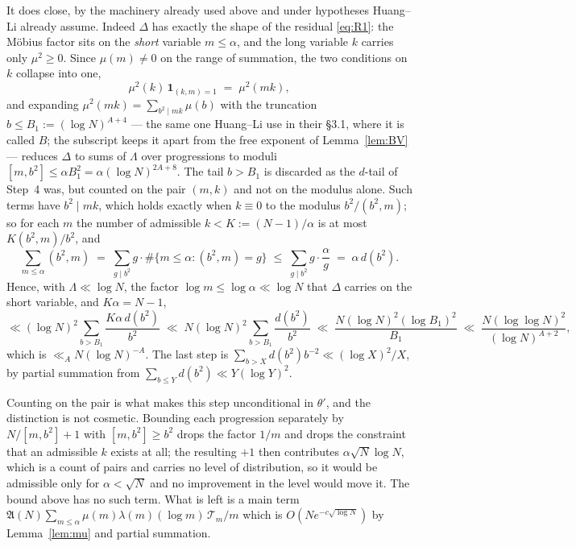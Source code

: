 \documentclass[11pt,a4paper]{article}
\theoremstyle{plain}
\theoremstyle{definition}
\theoremstyle{remark}
\newcommand{\AAA}{\mathfrak{A}}
\newcommand{\Tcut}{\mathcal T}
\begin{document}
It does close, by the machinery already used above and under
hypotheses Huang--Li already assume. Indeed $\Delta$ has exactly the
shape of the residual \eqref{eq:R1}: the M\"obius factor sits on the
\emph{short} variable $m\le\alpha$, and the long variable $k$ carries
only $\mu^2\ge0$. Since $\mu(m)\neq0$ on the range of summation, the
two conditions on $k$ collapse into one,
\begin{equation}\label{eq:mu2mk}
  \mu^2(k)\,\mathbf 1_{(k,m)=1}\;=\;\mu^2(mk),
\end{equation}
and expanding $\mu^2(mk)=\sum_{b^2\mid mk}\mu(b)$ with the truncation
$b\le B_1:=(\log N)^{A+4}$ --- the same one Huang--Li use in their
\S3.1, where it is called $B$; the subscript keeps it apart from the
free exponent of Lemma~\ref{lem:BV} --- reduces $\Delta$ to sums of
$\Lambda$ over progressions to moduli
$[m,b^2]\le\alpha B_1^2=\alpha(\log N)^{2A+8}$. The tail $b>B_1$ is
discarded as the $d$-tail of Step~4 was, but counted on the pair
$(m,k)$ and not on the modulus alone. Such terms have $b^2\mid mk$,
which holds exactly when $k\equiv0$ to the modulus $b^2/(b^2,m)$; so
for each $m$ the number of admissible $k<K:=(N-1)/\alpha$ is at most
$K(b^2,m)/b^{2}$, and
\[
  \sum_{m\le\alpha}(b^2,m)
   \;=\;\sum_{g\mid b^2}g\cdot\#\{m\le\alpha:(b^2,m)=g\}
   \;\le\;\sum_{g\mid b^2}g\cdot\frac{\alpha}{g}
   \;=\;\alpha\,d(b^2).
\]
Hence, with $\Lambda\ll\log N$, the factor $\log m\le\log\alpha\ll\log
N$ that $\Delta$ carries on the short variable, and $K\alpha=N-1$,
\[
  \ll(\log N)^{2}\!\!\sum_{b>B_1}\frac{K\alpha\,d(b^2)}{b^{2}}
  \;\ll\;N(\log N)^{2}\!\!\sum_{b>B_1}\frac{d(b^2)}{b^{2}}
  \;\ll\;\frac{N(\log N)^{2}(\log B_1)^{2}}{B_1}
  \;\ll\;\frac{N(\log\log N)^{2}}{(\log N)^{A+2}},
\]
which is $\ll_AN(\log N)^{-A}$. The last step is
$\sum_{b>X}d(b^2)b^{-2}\ll(\log X)^2/X$, by partial summation from
$\sum_{b\le Y}d(b^2)\ll Y(\log Y)^2$.

Counting on the pair is what makes this step unconditional in
$\theta'$, and the distinction is not cosmetic. Bounding each
progression separately by $N/[m,b^2]+1$ with $[m,b^2]\ge b^2$ drops the
factor $1/m$ and drops the constraint that an admissible $k$ exists at
all; the resulting $+1$ then contributes $\alpha\sqrt N\log N$, which
is a count of pairs and carries no level of distribution, so it would
be admissible only for $\alpha<\sqrt N$ and no improvement in the level
would move it. The bound above has no such term. What is left is a main term
$\AAA(N)\sum_{m\le\alpha}\mu(m)\lambda(m)(\log m)\,\Tcut_m/m$ which is
$O(Ne^{-c\sqrt{\log N}})$ by Lemma~\ref{lem:mu} and partial summation.
\end{document}
